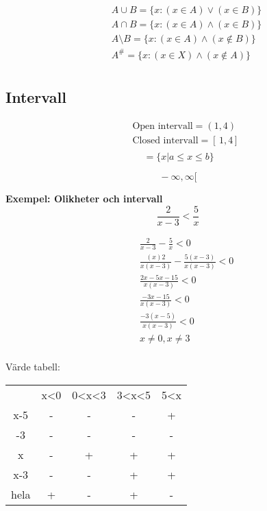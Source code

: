 \documentclass{article}
\begin{document}
\begin{align*}
  &\quad A \cup B = \{ x:(x \in A) \lor (x \in B)\} \\
  &\quad A \cap B = \{ x:(x \in A) \land (x \in B)\} \\
  &\quad A \setminus B = \{ x:(x \in A) \land (x \notin B)\} \\
  &\quad A^{\text{\#}} = \{ x:(x \in X) \land (x \notin A)\} \\
\end{align*}


\newpage

\subsection{Intervall}
\begin{align*}
  &\quad \text{Open intervall} = (1,4) \\
  &\quad \text{Closed intervall} = [ \, 1,4 ] \, \\
\end{align*}
\begin{equation}
[ \, a, b ] \, = \{ x | a \leq x \leq b \}
\end{equation}

\begin{equation}
[ \, a, \infty [ \,
\end{equation}
\begin{equation}
] \, -\infty, \infty [ \,
\end{equation}

\textbf{Exempel: Olikheter och intervall}
\begin{equation}
\frac { 2 } { x - 3 } < \frac { 5 } { x }
\end{equation}

\begin{align*}
&\quad \frac{ 2 }{ x - 3 } - \frac{ 5 }{ x } < 0 \\
&\quad \frac{(x) 2 }{x (x - 3)} - \frac{ 5 ( x - 3 )}{ x ( x - 3 ) } < 0 \\
&\quad \frac{ 2 x - 5 x - 15 }{ x ( x - 3 ) } < 0 \\
&\quad \frac{ - 3 x - 15 }{ x ( x - 3 ) } < 0 \\
&\quad \frac{ - 3 ( x - 5 ) }{ x ( x - 3 ) } < 0 \\
&\quad  x \neq 0 , x \neq 3 \\
\end{align*}

Värde tabell:
\begin{center}
\begin{tabular}{ |c|c|c|c|c| } 
 \hline
        & x<0   & 0<x<3 & 3<x<5 & 5<x   \\ 
 x-5    & -     & -     & -     & +     \\ 
 -3     & -     & -     & -     & -     \\  
 x      & -     & +     & +     & +     \\ 
 x-3    & -     & -     & +     & +     \\ 
 hela   & +     & -     & +     & -     \\ 
 \hline
\end{tabular}
\end{center}
\end{document}
